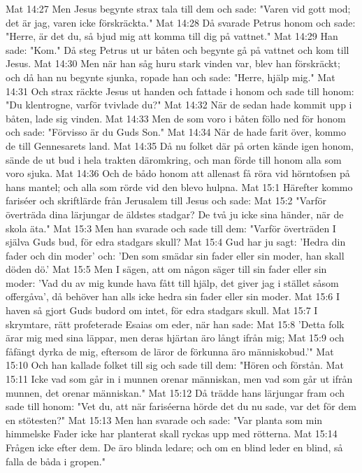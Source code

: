 Mat 14:27  Men Jesus begynte strax tala till dem och sade: "Varen vid gott mod; det är jag, varen icke förskräckta."
Mat 14:28  Då svarade Petrus honom och sade: "Herre, är det du, så bjud mig att komma till dig på vattnet."
Mat 14:29  Han sade: "Kom." Då steg Petrus ut ur båten och begynte gå på vattnet och kom till Jesus.
Mat 14:30  Men när han såg huru stark vinden var, blev han förskräckt; och då han nu begynte sjunka, ropade han och sade: "Herre, hjälp mig."
Mat 14:31  Och strax räckte Jesus ut handen och fattade i honom och sade till honom: "Du klentrogne, varför tvivlade du?"
Mat 14:32  När de sedan hade kommit upp i båten, lade sig vinden.
Mat 14:33  Men de som voro i båten föllo ned för honom och sade: "Förvisso är du Guds Son."
Mat 14:34  När de hade farit över, kommo de till Gennesarets land.
Mat 14:35  Då nu folket där på orten kände igen honom, sände de ut bud i hela trakten däromkring, och man förde till honom alla som voro sjuka.
Mat 14:36  Och de bådo honom att allenast få röra vid hörntofsen på hans mantel; och alla som rörde vid den blevo hulpna.
Mat 15:1  Härefter kommo fariséer och skriftlärde från Jerusalem till Jesus och sade:
Mat 15:2  "Varför överträda dina lärjungar de äldstes stadgar? De två ju icke sina händer, när de skola äta."
Mat 15:3  Men han svarade och sade till dem: "Varför överträden I själva Guds bud, för edra stadgars skull?
Mat 15:4  Gud har ju sagt: 'Hedra din fader och din moder' och: 'Den som smädar sin fader eller sin moder, han skall döden dö.'
Mat 15:5  Men I sägen, att om någon säger till sin fader eller sin moder: 'Vad du av mig kunde hava fått till hjälp, det giver jag i stället såsom offergåva', då behöver han alls icke hedra sin fader eller sin moder.
Mat 15:6  I haven så gjort Guds budord om intet, för edra stadgars skull.
Mat 15:7  I skrymtare, rätt profeterade Esaias om eder, när han sade:
Mat 15:8  'Detta folk ärar mig med sina läppar, men deras hjärtan äro långt ifrån mig;
Mat 15:9  och fåfängt dyrka de mig, eftersom de läror de förkunna äro människobud.'"
Mat 15:10  Och han kallade folket till sig och sade till dem: "Hören och förstån.
Mat 15:11  Icke vad som går in i munnen orenar människan, men vad som går ut ifrån munnen, det orenar människan."
Mat 15:12  Då trädde hans lärjungar fram och sade till honom: "Vet du, att när fariséerna hörde det du nu sade, var det för dem en stötesten?"
Mat 15:13  Men han svarade och sade: "Var planta som min himmelske Fader icke har planterat skall ryckas upp med rötterna.
Mat 15:14  Frågen icke efter dem. De äro blinda ledare; och om en blind leder en blind, så falla de båda i gropen."
